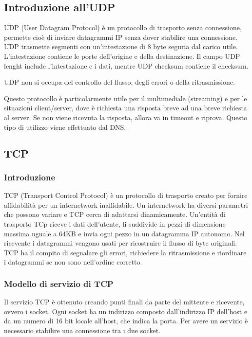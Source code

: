 \subsection{Introduzione all'UDP}
UDP (User Datagram Protocol) è un protocollo di trasporto senza connessione, permette cioè di inviare datagrammi IP senza dover stabilire una connessione.
UDP trasmette segmenti con un'intestazione di 8 byte seguita dal carico utile.
L'intestazione contiene le porte dell'origine e della destinazione.
Il campo UDP lenght include l'intestazione e i dati, mentre UDP checksum contiene il checksum.

UDP non si occupa del controllo del flusso, degli errori o della ritrasmissione.

Questo protocollo è particolarmente utile per il multimediale (streaming) e per le situazioni client/server,
dove è richiesta una risposta breve ad una breve richiesta al server.
Se non viene ricevuta la risposta, allora va in timeout e riprova.
Questo tipo di utilizzo viene effettuato dal DNS.

\subsection{TCP}

\subsubsection{Introduzione}
TCP (Transport Control Protocol) è un protocollo di trasporto creato per fornire affidabilità per un internetwork inaffidabile.
Un internetwork ha diversi parametri che possono variare e TCP cerca di adattarsi dinamicamente.
Un'entità di trasporto TCp riceve i dati dell'utente, li suddivide in pezzi di dimensione massima uguale a 64KB e invia ogni pezzo in un datagramma 
IP autonomo.
Nel ricevente i datagrammi vengono usati per ricostruire il flusso di byte originali. 
TCP ha il compito di segnalare gli errori, richiedere la ritrasmissione e riordinare i datagrammi se non sono nell'ordine corretto.

\subsubsection{Modello di servizio di TCP}
Il servizio TCP è ottenuto creando punti finali da parte del mittente e ricevente, ovvero i socket.
Ogni socket ha un indirizzo composto dall'indirizzo IP dell'host e da un numero di 16 bit locale all'host, che indica la porta.
Per avere un servizio è necessario stabilire una connessione tra i due socket.

